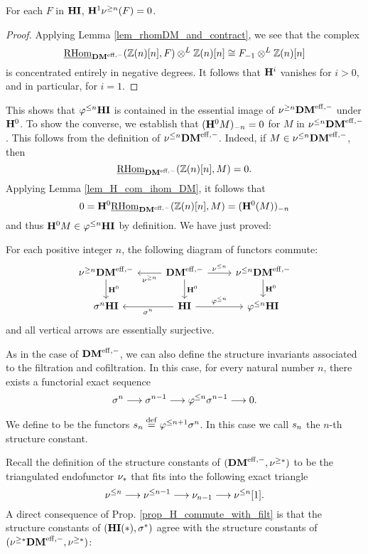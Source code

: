 \begin{lem}\label{lem_H1_sgDM_vanishes}
For each $F$ in $\HI$, $\HH^1 \sgDM{n}(F) = 0$.
\end{lem}
\begin{proof}
Applying Lemma \ref{lem_rhomDM_and_contract}, we see that the
complex
\[
\ihomDMf(\Z(n)[n], F) \tDM \Z(n)[n] \cong \RHI{F} \tDM \Z(n)[n]
\] 
is concentrated entirely in negative degrees. It follows that 
$\HH^i$ vanishes for $i > 0$, and in particular, for $i = 
1$.
\end{proof}

This shows that $\tlHI{n}\HI$ is contained in the essential image 
of $\sgDM{n}\DMeff$ under $\HH^0$. To show the converse, we 
establish that $\RHI[n]{(\HH^0 M)} = 0$ for $M$ in 
$\slDM{n}\DMeff$. This follows from the definition of 
$\slDM{n}\DMeff$. Indeed, if $M \in \slDM{n}\DMeff$, 
then 
\[
\ihomDMf(\Z(n)[n], M) = 0.
\] 
Applying Lemma \ref{lem_H_com_ihom_DM}, it follows that
\[
0 = \HH^0\ihomDMf(\Z(n)[n], M) = \RHI[n]{(\HH^0(M))}
\]
and thus $\HH^0 M \in \tlHI{n}\HI$ by definition. We
have just proved:

\begin{prop}\label{prop_H_commute_with_filt}
For each positive integer $n$, the following diagram of functors 
commute:
\[
\begin{tikzcd}
\sgDM{n}\DMeff \arrow{d}{\HH^0} &
\DMeff \arrow{l}{\sgDM{n}} \arrow{r}{\slDM{n}} \arrow{d}{\HH^0} &
\slDM{n}\DMeff \arrow{d}{\HH^0} \\
\sgHI{n}\HI &
\HI \arrow{l}{\sgHI{n}} \arrow{r}{\tlHI{n}} &
\tlHI{n}\HI 
\end{tikzcd}
\]
and all vertical arrows are essentially surjective.
\end{prop}

As in the case of $\DMeff$, we can also define the structure 
invariants associated to the filtration and cofiltration. In this
case, for every natural number $n$, there exists a functorial 
exact sequence
\[
\sgHI{n} \to \sgHI{n - 1} \to \tlHI{n}\sgHI{n - 1} \to 0.
\]
\begin{defn}
We define  to be the 
functors $\slice{n} \defeq \tlHI{n + 1}\sgHI{n}$. In this case we 
call $\slice{n}$ the $n$-th structure constant.
\end{defn}

Recall the definition of the structure constants of $(\DMeff, 
\sgDM{*})$ to be the triangulated endofunctor $\sliceDM{*}$ that
fits into the following exact triangle
\[
\slDM{n} \to \slDM{n - 1} \to \sliceDM{n - 1} \to \slDM{n}[1].
\]
A direct consequence of Prop. \ref{prop_H_commute_with_filt} is 
that the structure constants of $(\LHI[*]{\HI}, \sgHI{*})$ agree 
with the structure constants of $(\sgDM{*}\DMeff, \sgDM{*})$:

